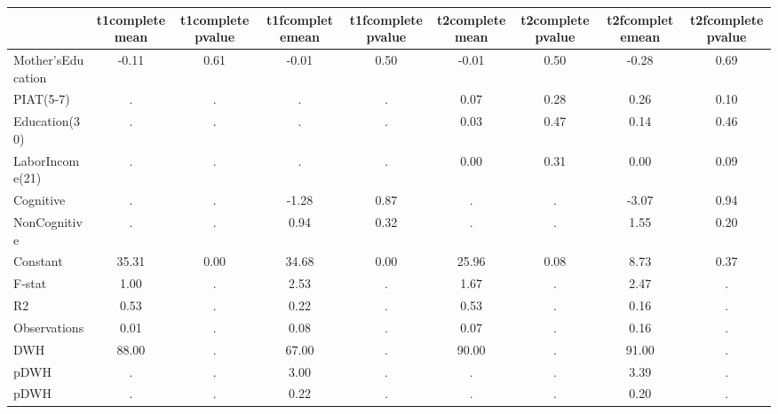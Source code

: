 \begin{table}[htbp]
\begin{tabular}{lcccccccc} \hline \hline
 & t1completemean  & t1completepvalue  & t1fcompletemean  & t1fcompletepvalue  & t2completemean  & t2completepvalue  & t2fcompletemean  & t2fcompletepvalue  \\  \hline 
Mother'sEducation &        -0.11 &         0.61 &        -0.01 &         0.50 &        -0.01 &         0.50 &        -0.28 &         0.69 \\  
PIAT(5-7) &            . &            . &            . &            . &         0.07 &         0.28 &         0.26 &         0.10 \\  
Education(30) &            . &            . &            . &            . &         0.03 &         0.47 &         0.14 &         0.46 \\  
LaborIncome(21) &            . &            . &            . &            . &         0.00 &         0.31 &         0.00 &         0.09 \\  
Cognitive &            . &            . &        -1.28 &         0.87 &            . &            . &        -3.07 &         0.94 \\  
NonCognitive &            . &            . &         0.94 &         0.32 &            . &            . &         1.55 &         0.20 \\  
Constant &        35.31 &         0.00 &        34.68 &         0.00 &        25.96 &         0.08 &         8.73 &         0.37 \\  
F-stat &         1.00 &            . &         2.53 &            . &         1.67 &            . &         2.47 &            . \\  
R2 &         0.53 &            . &         0.22 &            . &         0.53 &            . &         0.16 &            . \\  
Observations &         0.01 &            . &         0.08 &            . &         0.07 &            . &         0.16 &            . \\  
DWH &        88.00 &            . &        67.00 &            . &        90.00 &            . &        91.00 &            . \\  
pDWH &            . &            . &         3.00 &            . &            . &            . &         3.39 &            . \\  
pDWH &            . &            . &         0.22 &            . &            . &            . &         0.20 &            . \\  
\hline \hline \end{tabular}
\end{table}
